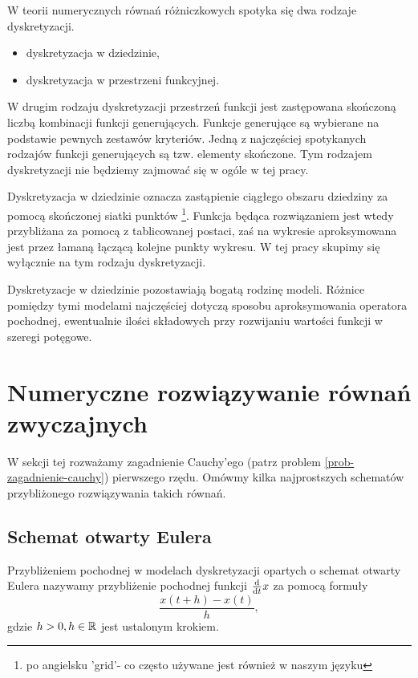 \documentclass[12pt,a4paper]{report}
\begin{document}
W teorii numerycznych równań różniczkowych spotyka się dwa rodzaje dyskretyzacji.
\begin{itemize}
\item dyskretyzacja w dziedzinie,
\item dyskretyzacja w przestrzeni funkcyjnej.
\end{itemize}

W drugim rodzaju dyskretyzacji przestrzeń funkcji jest zastępowana skończoną liczbą kombinacji funkcji generujących. Funkcje generujące są wybierane na podstawie pewnych zestawów kryteriów. Jedną z najczęściej spotykanych rodzajów funkcji generujących są tzw. elementy skończone. Tym rodzajem dyskretyzacji nie będziemy zajmować się w ogóle w tej pracy.

Dyskretyzacja w dziedzinie oznacza zastąpienie ciągłego obszaru dziedziny za pomocą skończonej siatki punktów \footnote{po angielsku 'grid'- co często używane jest również w naszym języku}. Funkcja będąca rozwiązaniem jest wtedy przybliżana za pomocą  z tablicowanej postaci, zaś na wykresie aproksymowana jest przez łamaną łączącą kolejne punkty wykresu. W tej pracy skupimy się wyłącznie na tym rodzaju dyskretyzacji. 

Dyskretyzacje w dziedzinie pozostawiają bogatą rodzinę modeli. Różnice pomiędzy tymi modelami najczęściej dotyczą sposobu aproksymowania operatora pochodnej, ewentualnie ilości składowych przy rozwijaniu wartości funkcji w szeregi potęgowe. 


\section{Numeryczne rozwiązywanie równań zwyczajnych}

W sekcji tej rozważamy zagadnienie Cauchy'ego (patrz problem \ref{prob-zagadnienie-cauchy}) pierwszego rzędu. Omówmy kilka najprostszych schematów przybliżonego rozwiązywania takich równań.

\subsection{Schemat otwarty Eulera}

\begin{definition}
Przybliżeniem pochodnej w modelach dyskretyzacji opartych o schemat otwarty Eulera nazywamy przybliżenie pochodnej funkcji $\frac{\mathrm{d} {} }{\mathrm{d}{t}}x$ za pomocą formuły 
$$
 \frac{x(t+h) - x(t)}{h},
$$
gdzie $h >0, h \in \mathbb{R} $ jest ustalonym krokiem. 
\end{definition}
\end{document}
